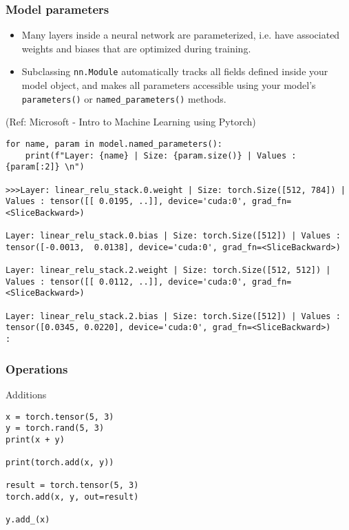 \begin{frame}[fragile] \frametitle{Model parameters}

\begin{itemize}
\item Many layers inside a neural network are parameterized, i.e. have associated weights and biases that are optimized during training. 
\item  Subclassing \lstinline|nn.Module| automatically tracks all fields defined inside your model object, and makes all parameters accessible using your model's \lstinline|parameters()| or \lstinline|named_parameters()| methods.
\end{itemize}

\tiny{(Ref: Microsoft - Intro to Machine Learning using Pytorch)}

\begin{lstlisting}
for name, param in model.named_parameters():
    print(f"Layer: {name} | Size: {param.size()} | Values : {param[:2]} \n")
		
>>>Layer: linear_relu_stack.0.weight | Size: torch.Size([512, 784]) | Values : tensor([[ 0.0195, ..]], device='cuda:0', grad_fn=<SliceBackward>) 

Layer: linear_relu_stack.0.bias | Size: torch.Size([512]) | Values : tensor([-0.0013,  0.0138], device='cuda:0', grad_fn=<SliceBackward>) 

Layer: linear_relu_stack.2.weight | Size: torch.Size([512, 512]) | Values : tensor([[ 0.0112, ..]], device='cuda:0', grad_fn=<SliceBackward>) 

Layer: linear_relu_stack.2.bias | Size: torch.Size([512]) | Values : tensor([0.0345, 0.0220], device='cuda:0', grad_fn=<SliceBackward>) 
:
\end{lstlisting}

\end{frame}


\begin{frame}[fragile] \frametitle{Operations}
Additions
\begin{lstlisting}
x = torch.tensor(5, 3)
y = torch.rand(5, 3)
print(x + y)

print(torch.add(x, y))

result = torch.tensor(5, 3)
torch.add(x, y, out=result)

y.add_(x)
\end{lstlisting}
\end{frame}

